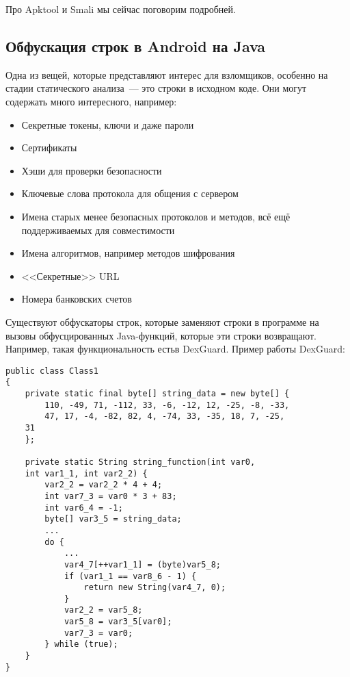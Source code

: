\documentclass[10pt, a5paper]{article}
\begin{document}
Про Apktool и Smali мы сейчас поговорим подробней.

\subsection*{Обфускация строк в Android на Java}

Одна из вещей, которые представляют интерес для взломщиков, особенно на стадии статического анализа~--- это строки в исходном коде. Они могут содержать много интересного, например:

\begin{itemize}
  \item Секретные токены, ключи и даже пароли
  \item Сертификаты
  \item Хэши для проверки безопасности
  \item Ключевые слова протокола для общения с сервером
  \item Имена старых менее безопасных протоколов и методов, всё ещё поддерживаемых для совместимости
  \item Имена алгоритмов, например методов шифрования
  \item <<Секретные>> URL
  \item Номера банковских счетов
\end{itemize}

Существуют обфускаторы строк, которые заменяют строки в программе на вызовы обфусцированных Java-функций, которые эти строки возвращают. Например, такая функциональность есть\linebreak в DexGuard. Пример работы DexGuard:

\begin{verbatim}
public class Class1
{
    private static final byte[] string_data = new byte[] {
        110, -49, 71, -112, 33, -6, -12, 12, -25, -8, -33,
        47, 17, -4, -82, 82, 4, -74, 33, -35, 18, 7, -25, 
	31
    };

    private static String string_function(int var0, 
	int var1_1, int var2_2) {
        var2_2 = var2_2 * 4 + 4;
        int var7_3 = var0 * 3 + 83;
        int var6_4 = -1;
        byte[] var3_5 = string_data;
        ...
        do {
            ...
            var4_7[++var1_1] = (byte)var5_8;
            if (var1_1 == var8_6 - 1) {
                return new String(var4_7, 0);
            }
            var2_2 = var5_8;
            var5_8 = var3_5[var0];
            var7_3 = var0;
        } while (true);
    }
}
\end{verbatim}
\end{document}
